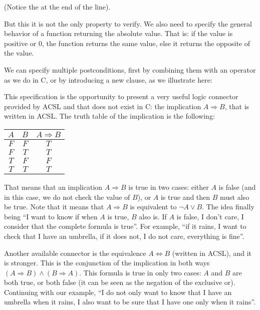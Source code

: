 


(Notice the \CodeInline{;} at the end of the line).

But this it is not the only property to verify. We also need to specify
the general behavior of a function returning the absolute value. That
is: if the value is positive or 0, the function returns the same value,
else it returns the opposite of the value.

We can specify multiple postconditions, first by combining them with an operator
\CodeInline{\&\&} as we do in C, or by introducing a new 
clause, as we illustrate here:







This specification is the opportunity to present a very useful logic
connector provided by ACSL and that does not exist in C: the implication
$A \Rightarrow B$, that is written  in
ACSL. The truth table of the implication is the following:



\begin{longtabu}{|c|c|c|} \hline
$A$ & $B$ & $A \Rightarrow B$ \\ \hline
$F$ & $F$ & $T$ \\ \hline
$F$ & $T$ & $T$ \\ \hline
$T$ & $F$ & $F$ \\ \hline
$T$ & $T$ & $T$ \\ \hline
\end{longtabu}



That means that an implication $A \Rightarrow B$ is true in two cases:
either $A$ is false (and in this case, we do not check the value of
$B$), or $A$ is true and then $B$ must also be true. Note that it means
that $A \Rightarrow B$ is equivalent to $\neg A \vee B$. The idea
finally being ``I want to know if when $A$ is true, $B$ also is. If
$A$ is false, I don't care, I consider that the complete formula is
true''. For example, ``if it rains, I want to check that I have an
umbrella, if it does not, I do not care, everything is fine''.



Another available connector is the equivalence $A \Leftrightarrow B$
(written  in ACSL), and it is
stronger. This is the conjunction of the implication in both ways
$(A \Rightarrow B) \wedge (B \Rightarrow A)$. This formula is true in
only two cases: $A$ and $B$ are both true, or both false (it can be seen
as the negation of the exclusive or). Continuing with our example, ``I
do not only want to know that I have an umbrella when it rains, I also
want to be sure that I have one only when it rains''.



